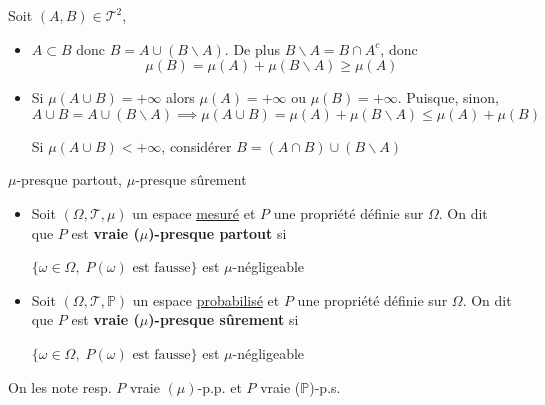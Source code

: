 \begin{myproof}{}{}
Soit $(A,B) \in \mathcal{T} ^{2}$, 
\begin{itemize}

    \item $A \subset B$ donc $B = A \cup (B \backslash A)$. De plus $B \backslash A = B \cap A ^{c}$, donc 
      \begin{equation}
        \mu(B) = \mu(A) + \mu(B \backslash A) \ge \mu(A)
      \end{equation}

    \item Si $\mu(A \cup B) = + \infty$ alors $\mu(A) = + \infty$ ou $\mu(B) = +\infty$. Puisque, sinon, 
      \begin{equation}
        A \cup B = A \cup (B \backslash A) \implies \mu (A \cup B) = \mu(A) + \mu(B \backslash A)\le \mu(A) + \mu(B)
      \end{equation}

      Si $\mu(A \cup B) < + \infty$, considérer $B = (A \cap B) \cup (B \backslash A)$

\end{itemize}

\end{myproof}


\begin{Definition}[colbacktitle=red!75!black]{$\mu$-presque partout, $\mu$-presque sûrement}{}
\begin{itemize}

  \item Soit $(\Omega, \mathcal{T}, \mu)$ un espace \underline{mesuré} et $P$ une propriété définie sur $\Omega$. On dit que $P$ est \textbf{vraie ($\mu$)-presque partout} si 
    \begin{center}
      $\{\omega \in \Omega, \; P(\omega) \text{ est fausse}\}$ est $\mu$-négligeable
    \end{center}
  \item Soit $(\Omega, \mathcal{T}, \mathbb{P})$ un espace \underline{probabilisé} et $P$ une propriété définie sur $\Omega$. On dit que $P$ est \textbf{vraie ($\mu$)-presque sûrement} si 
    \begin{center}
      $\{\omega \in \Omega, \; P(\omega) \text{ est fausse}\}$ est $\mu$-négligeable
    \end{center}

\end{itemize}

On les note resp. $P$ vraie $(\mu)$-p.p. et $P$ vraie ($\mathbb{P}$)-p.s.
\end{Definition}

